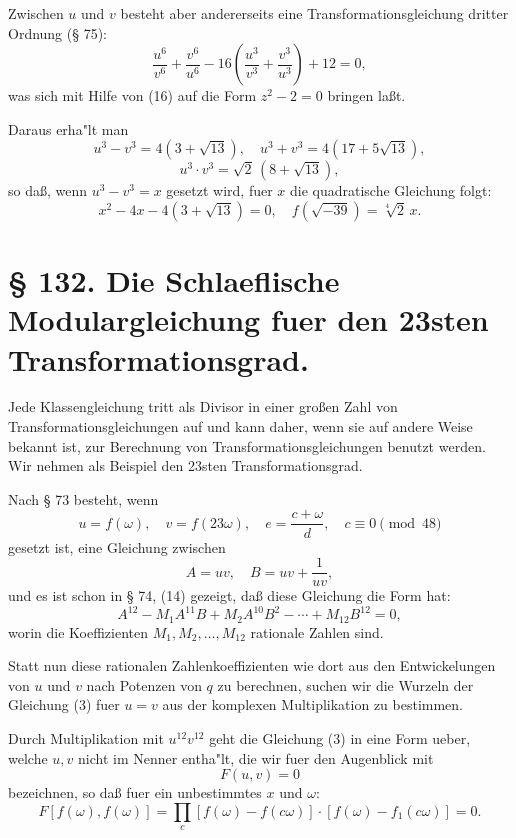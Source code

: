 \documentclass[12pt,a4paper]{article}
\theoremstyle{plain}
\theoremstyle{definition}
\theoremstyle{remark}
\begin{document}
Zwischen $u$ und $v$ besteht aber andererseits eine Transformationsgleichung dritter Ordnung (\S{} 75):
\[
\frac{u^6}{v^6} + \frac{v^6}{u^6} - 16\left(\frac{u^3}{v^3} + \frac{v^3}{u^3}\right) + 12 = 0,
\]
was sich mit Hilfe von (16) auf die Form $z^2 - 2 = 0$ bringen la\ss{}t.

Daraus erha"lt man
\[
u^3 - v^3 = 4(3 + \sqrt{13}), \quad u^3 + v^3 = 4(17 + 5\sqrt{13}),
\]
\[
u^3 \cdot v^3 = \sqrt{2}\, (8 + \sqrt{13}),
\]
so da\ss{}, wenn $u^3 - v^3 = x$ gesetzt wird, fuer $x$ die quadratische Gleichung folgt:
\begin{equation}\label{eq:131_17}
x^2 - 4x - 4(3 + \sqrt{13}) = 0, \quad f(\sqrt{-39}) = \sqrt[4]{2}\, x.
\end{equation}

\newpage

\section*{\S{} 132. Die Schlaeflische Modulargleichung fuer den 23sten Transformationsgrad.}

Jede Klassengleichung tritt als Divisor in einer gro\ss{}en Zahl von Transformationsgleichungen auf und kann daher, wenn sie auf andere Weise bekannt ist, zur Berechnung von Transformationsgleichungen benutzt werden. Wir nehmen als Beispiel den 23sten Transformationsgrad.

Nach \S{} 73 besteht, wenn
\[
u = f(\omega), \quad v = f(23\omega), \quad e = \frac{c + \omega}{d}, \quad c \equiv 0 \pmod{48}
\]
gesetzt ist, eine Gleichung zwischen
\begin{equation}\label{eq:132_1}
A = uv, \quad B = uv + \frac{1}{uv},
\end{equation}
und es ist schon in \S{} 74, (14) gezeigt, da\ss{} diese Gleichung die Form hat:
\begin{equation}\label{eq:132_3}
A^{12} - M_1 A^{11} B + M_2 A^{10} B^2 - \cdots + M_{12} B^{12} = 0,
\end{equation}
worin die Koeffizienten $M_1, M_2, \ldots, M_{12}$ rationale Zahlen sind.

Statt nun diese rationalen Zahlenkoeffizienten wie dort aus den Entwickelungen von $u$ und $v$ nach Potenzen von $q$ zu berechnen, suchen wir die Wurzeln der Gleichung (3) fuer $u = v$ aus der komplexen Multiplikation zu bestimmen.

Durch Multiplikation mit $u^{12} v^{12}$ geht die Gleichung (3) in eine Form ueber, welche $u, v$ nicht im Nenner entha"lt, die wir fuer den Augenblick mit
\begin{equation}\label{eq:132_4}
F(u, v) = 0
\end{equation}
bezeichnen, so da\ss{} fuer ein unbestimmtes $x$ und $\omega$:
\begin{equation}\label{eq:132_5}
F[f(\omega), f(\omega)] = \prod_{c} [f(\omega) - f(c\omega)] \cdot [f(\omega) - f_1(c\omega)] = 0.
\end{equation}
\end{document}
